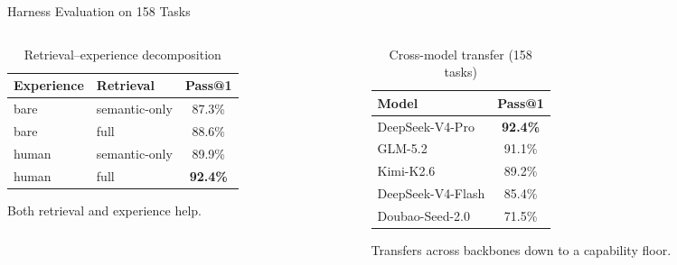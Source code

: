 \documentclass{beamer}
\begin{document}
\begin{frame}{Harness Evaluation on 158 Tasks}
    \begin{columns}
        \begin{column}{.45\textwidth}
            \begin{table}[h]
                \centering
                \caption{Retrieval--experience decomposition}
                \scriptsize
                \begin{tabular}{llc}
                    \toprule
                    Experience & Retrieval & Pass@1 \\
                    \midrule
                    bare & semantic-only & 87.3\% \\
                    bare & full & 88.6\% \\
                    human & semantic-only & 89.9\% \\
                    human & full & \textbf{92.4\%} \\
                    \bottomrule
                \end{tabular}
            \end{table}
            \footnotesize Both retrieval and experience help.
        \end{column}
        \begin{column}{.45\textwidth}
            \begin{table}[h]
                \centering
                \caption{Cross-model transfer (158 tasks)}
                \scriptsize
                \begin{tabular}{lc}
                    \toprule
                    Model & Pass@1 \\
                    \midrule
                    DeepSeek-V4-Pro & \textbf{92.4\%} \\
                    GLM-5.2 & 91.1\% \\
                    Kimi-K2.6 & 89.2\% \\
                    DeepSeek-V4-Flash & 85.4\% \\
                    Doubao-Seed-2.0 & 71.5\% \\
                    \bottomrule
                \end{tabular}
            \end{table}
            \footnotesize Transfers across backbones down to a capability floor.
        \end{column}
    \end{columns}
\end{frame}
\end{document}
